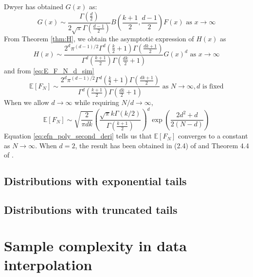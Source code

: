 \documentclass{aptpub}
\def\E{\mathbb{E}}
\begin{document}
Dwyer\cite{dwyer1991convex} has obtained $G(x)$ as:
\begin{equation}
     G(x) \sim \frac{\Gamma(\frac{d}{2})}{2\sqrt{\pi} \Gamma(\frac{d-1}{2})}
     B\left(\frac{k+1}{2}, \frac{d-1}{2}\right) F(x)  \textrm{ as } x\to \infty
\end{equation}
From Theorem \ref{thm:H}, we obtain the asymptotic
expression of $H(x)$ as
\begin{equation}
     H(x) \sim \frac{2^d \pi^{(d-1)/2}\Gamma^d(\frac{k}{2}+1)
     \Gamma(\frac{dk+1}{2})}{
         \Gamma^d(\frac{k+1}{2}) \Gamma(\frac{dk}{2}+1)} G(x)^d 
         \textrm{ as } x\to \infty
\end{equation}
and from \eqref{eq:E_F_N_d_sim}
\begin{equation}\label{eq:efn_poly_second_deri}
    \E[F_N] \sim \frac{2^d \pi^{(d-1)/2}\Gamma^d(\frac{k}{2}+1)
    \Gamma(\frac{dk+1}{2})}{
        \Gamma^d(\frac{k+1}{2}) \Gamma(\frac{dk}{2}+1)}
        \textrm{ as } N \to \infty, d \textrm { is fixed}
\end{equation}
When we allow $d\to \infty$ while requiring $N/d \to \infty$,
\begin{equation}\label{eq:poly_E_F_N_d_infty}
\E[F_N] \sim \sqrt{\frac{2}{\pi dk}}\left(
     \frac{\sqrt{\pi}k \Gamma(k/2)}
     {\Gamma(\frac{k+1}{2})}
 \right)^d
    \exp
      \left(\frac{2d^2+d}{2(N-d)} \right)  
\end{equation}
Equation \eqref{eq:efn_poly_second_deri} tells
us that $\E[F_N]$ converges to a constant as $N \to \infty$.
When $d=2$, the result has been obtained in (2.4) of \cite{carnal1970konvexe}
and Theorem 4.4 of \cite{davis1987convex}.
\subsection{Distributions with exponential tails}
\subsection{Distributions with truncated tails}
\section{Sample complexity in data interpolation}\label{sec:sample_complexity}

\end{document}
